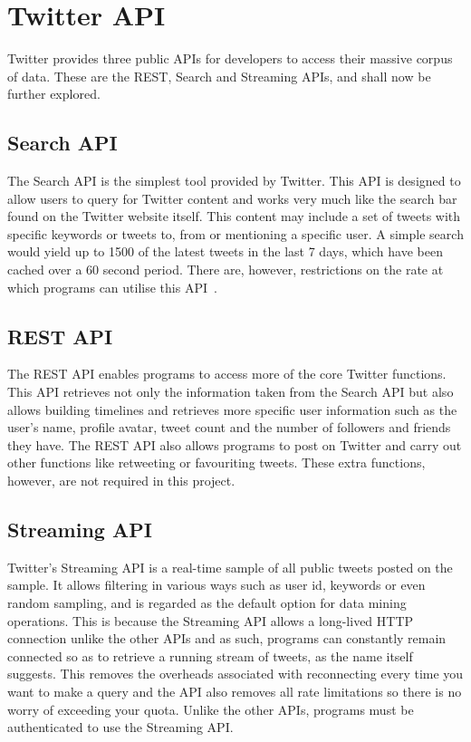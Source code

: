 
\section{Twitter API}
Twitter provides three public APIs for developers to access their massive corpus of data. These are the REST, Search and Streaming APIs, and shall now be further explored.

\subsection{Search API}
The Search API is the simplest tool provided by Twitter. This API is designed to allow users to query for Twitter content and works very much like the search bar found on the Twitter website itself. This content may include a set of tweets with specific keywords or tweets to, from or mentioning a specific user. A simple search would yield up to 1500 of the latest tweets in the last 7 days, which have been cached over a 60 second period. There are, however, restrictions on the rate at which programs can utilise this API~\cite{twitter}.

\subsection{REST API}
The REST API enables programs to access more of the core Twitter functions. This API retrieves not only the information taken from the Search API but also allows building timelines and retrieves more specific user information such as the user's name, profile avatar, tweet count and the number of followers and friends they have. The REST API also allows programs to post on Twitter and carry out other functions like retweeting or favouriting tweets. These extra functions, however, are not required in this project.

\subsection{Streaming API}
Twitter's Streaming API is a real-time sample of all public tweets posted on the sample. It allows filtering in various ways such as user id, keywords or even random sampling, and is regarded as the default option for data mining operations. This is because the Streaming API allows a long-lived HTTP connection unlike the other APIs and as such, programs can constantly remain connected so as to retrieve a running stream of tweets, as the name itself suggests. This removes the overheads associated with reconnecting every time you want to make a query and the API also removes all rate limitations so there is no worry of exceeding your quota. Unlike the other APIs, programs must be authenticated to use the Streaming API.

